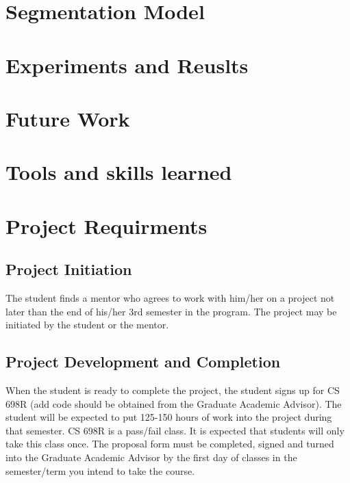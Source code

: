 \documentclass[ms,electronic,oneside,twosidetoc,letterpaper,chaptercenter,parttop]{byumsphd}
\begin{document}
\chapter{Segmentation Model}
\chapter{Experiments and Reuslts}

\chapter{Future Work}

\chapter{Tools and skills learned}

\chapter*{Project Requirments}

\section{Project Initiation}
The student finds a mentor who agrees to work with him/her on a project not later than the end of his/her 3rd semester in the program. The project may be initiated by the student or the mentor. 
 

\section{Project Development and Completion}

When the student is ready to complete the project, the student signs up for CS 698R (add code should be obtained from the Graduate Academic Advisor). The student will be expected to put 125-150 hours of work into the project during that semester. CS 698R is a pass/fail class. It is expected that students will only take this class once. The proposal form must be completed, signed and turned into the Graduate Academic Advisor by the first day of classes in the semester/term you intend to take the course.
\end{document}
